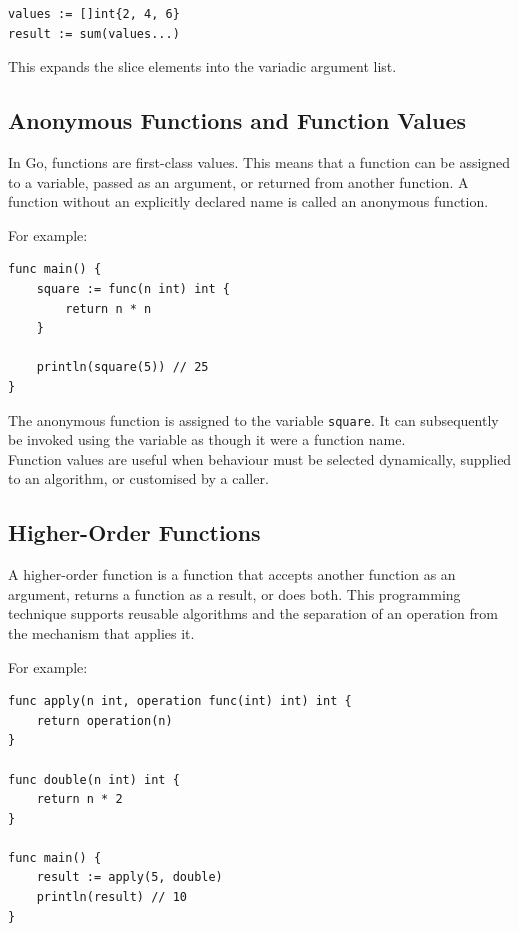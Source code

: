 \begin{lstlisting}
values := []int{2, 4, 6}
result := sum(values...)
\end{lstlisting}

This expands the slice elements into the variadic argument list.

\subsection{Anonymous Functions and Function Values}

In Go, functions are first-class values. This means that a function can be assigned to a variable, passed as an argument, or returned from another function. A function without an explicitly declared name is called an anonymous function.

For example:

\begin{lstlisting}
func main() {
    square := func(n int) int {
        return n * n
    }

    println(square(5)) // 25
}
\end{lstlisting}

The anonymous function is assigned to the variable \texttt{square}. It can subsequently be invoked using the variable as though it were a function name.\\

Function values are useful when behaviour must be selected dynamically, supplied to an algorithm, or customised by a caller.

\subsection{Higher-Order Functions}

A higher-order function is a function that accepts another function as an argument, returns a function as a result, or does both. This programming technique supports reusable algorithms and the separation of an operation from the mechanism that applies it.

For example:

\begin{lstlisting}
func apply(n int, operation func(int) int) int {
    return operation(n)
}

func double(n int) int {
    return n * 2
}

func main() {
    result := apply(5, double)
    println(result) // 10
}
\end{lstlisting}

